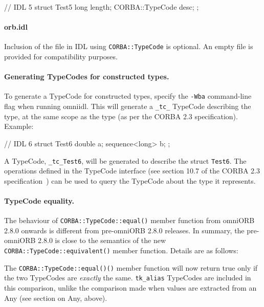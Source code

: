 \documentclass[11pt,twoside,a4paper]{book}
\newcommand{\type}[1]{\texttt{#1}}
\newcommand{\code}[1]{\texttt{#1}}
\newcommand{\op}[1]{\texttt{#1()}}
\newcommand{\file}{\begingroup \urlstyle{tt}\Url}
\begin{document}
\begin{idllisting}
// IDL 5
struct Test5 {
  long length;
  CORBA::TypeCode desc;
};
\end{idllisting}

\paragraph*{orb.idl}

Inclusion of the file \file{orb.idl} in IDL using
\type{CORBA::TypeCode} is optional.  An empty \file{orb.idl} file is
provided for compatibility purposes.

\paragraph*{Generating TypeCodes for constructed types.}

To generate a TypeCode for constructed types, specify the
\texttt{-Wba} command-line flag when running omniidl. This will
generate a \code{\_tc\_} TypeCode describing the type, at the same
scope as the type (as per the CORBA 2.3 specification). Example:

\begin{idllisting}
// IDL 6
struct Test6 {
  double a;
  sequence<long> b;
};
\end{idllisting}

A TypeCode, \code{\_tc\_Test6}, will be generated to describe the
struct \type{Test6}. The operations defined in the TypeCode interface
(see section 10.7 of the CORBA 2.3 specification~\cite{corba23-spec})
can be used to query the TypeCode about the type it represents.


\paragraph*{TypeCode equality.}

The behaviour of \op{CORBA::TypeCode::equal} member function from
omniORB 2.8.0 onwards is different from pre-omniORB 2.8.0 releases.
In summary, the pre-omniORB 2.8.0 is close to the semantics of the new
\op{CORBA::TypeCode::equivalent} member function. Details are as
follows:

The \op{CORBA::TypeCode::equal()} member function will now return true
only if the two TypeCodes are \emph{exactly} the same.
\code{tk\_alias} TypeCodes are included in this comparison, unlike the
comparison made when values are extracted from an Any (see section on
Any, above).
\end{document}
